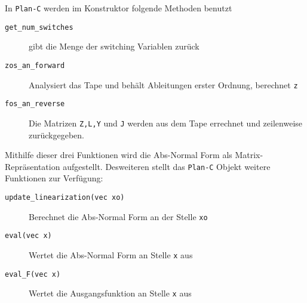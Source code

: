 In \texttt{Plan-C} werden im Konstruktor folgende Methoden benutzt
\begin{description}
 \item[\texttt{get\_num\_switches}] gibt die Menge der switching Variablen zurück
 \item[\texttt{zos\_an\_forward}] Analysiert das Tape und behält Ableitungen erster Ordnung, berechnet \texttt{z}
 \item[\texttt{fos\_an\_reverse}] Die Matrizen \texttt{Z,L,Y} und \texttt{J} werden aus dem Tape errechnet und zeilenweise zurückgegeben.
\end{description}
Mithilfe dieser drei Funktionen wird die Abs-Normal Form als Matrix-Repräsentation aufgestellt.
Desweiteren stellt das \texttt{Plan-C} Objekt weitere Funktionen zur Verfügung:
\begin{description}
 \item[\texttt{update\_linearization(vec xo)}] Berechnet die Abs-Normal Form an der Stelle \texttt{xo}
 \item[\texttt{eval(vec x)}] Wertet die Abs-Normal Form an Stelle \texttt{x} aus
 \item[\texttt{eval\_F(vec x)}] Wertet die Ausgangsfunktion an Stelle \texttt{x} aus 
\end{description}

